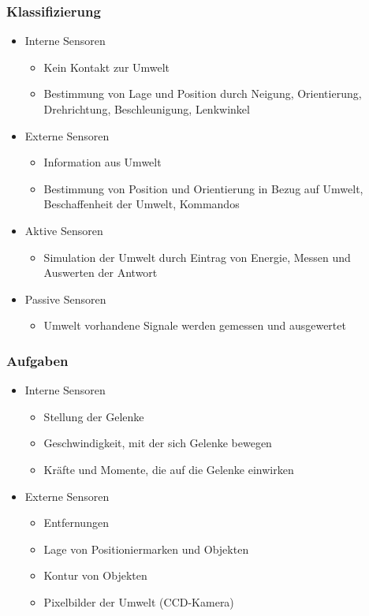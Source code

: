 \documentclass[paper=a4, fontsize=11pt]{scrartcl} %
\numberwithin{equation}{section} %
\numberwithin{figure}{section} %
\numberwithin{table}{section} %
\begin{document}
\subsubsection{Klassifizierung}

\begin{itemize}
\item Interne Sensoren
\begin{itemize}
\item Kein Kontakt zur Umwelt
\item Bestimmung von Lage und Position durch Neigung, Orientierung, Drehrichtung, Beschleunigung, Lenkwinkel
\end{itemize}
\item Externe Sensoren
\begin{itemize}
\item Information aus Umwelt
\item Bestimmung von Position und Orientierung in Bezug auf Umwelt, Beschaffenheit der Umwelt, Kommandos
\end{itemize}
\item Aktive Sensoren
\begin{itemize}
\item Simulation der Umwelt durch Eintrag von Energie, Messen und Auswerten der Antwort
\end{itemize}
\item Passive Sensoren
\begin{itemize}
\item Umwelt vorhandene Signale werden gemessen und ausgewertet
\end{itemize}
\end{itemize}

\subsubsection{Aufgaben}

\begin{itemize}
\item Interne Sensoren
\begin{itemize}
\item Stellung der Gelenke
\item Geschwindigkeit, mit der sich Gelenke bewegen
\item Kräfte und Momente, die auf die Gelenke einwirken
\end{itemize}
\item Externe Sensoren
\begin{itemize}
\item Entfernungen
\item Lage von Positioniermarken und Objekten
\item Kontur von Objekten
\item Pixelbilder der Umwelt (CCD-Kamera)
\end{itemize}
\end{itemize}
\end{document}
